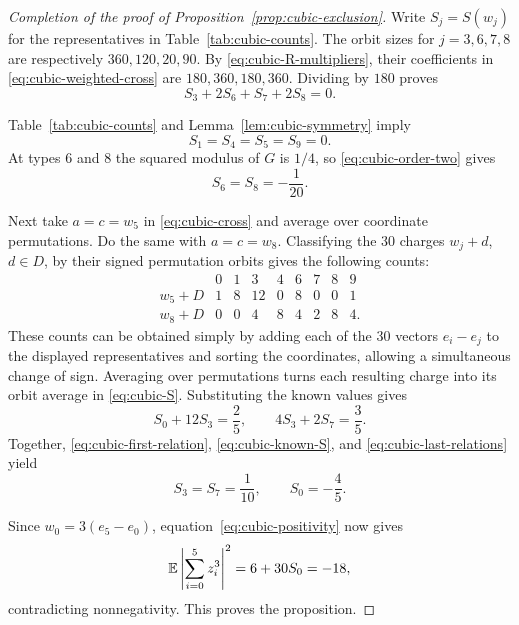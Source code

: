 \begin{proof}[Completion of the proof of Proposition~\ref{prop:cubic-exclusion}]
Write $S_j=S(w_j)$ for the representatives in Table~\ref{tab:cubic-counts}.
The orbit sizes for $j=3,6,7,8$ are respectively
$360,120,20,90$. By \eqref{eq:cubic-R-multipliers}, their coefficients in
\eqref{eq:cubic-weighted-cross}
are $180,360,180,360$. Dividing by $180$ proves
\begin{equation}\label{eq:cubic-first-relation}
 S_3+2S_6+S_7+2S_8=0.
\end{equation}

Table~\ref{tab:cubic-counts} and Lemma~\ref{lem:cubic-symmetry} imply
\[
 S_1=S_4=S_5=S_9=0.
\]
At types $6$ and $8$ the squared modulus of $G$ is $1/4$, so
\eqref{eq:cubic-order-two} gives
\begin{equation}\label{eq:cubic-known-S}
 S_6=S_8=-\frac1{20}.
\end{equation}

Next take $a=c=w_5$ in \eqref{eq:cubic-cross} and average over
coordinate permutations. Do the same with $a=c=w_8$. Classifying the
$30$ charges $w_j+d$, $d\in D$, by their signed permutation orbits
gives the following counts:
\[
\begin{array}{c|rrrrrrrr}
 &0&1&3&4&6&7&8&9\\\hline
 w_5+D&1&8&12&0&8&0&0&1\\
 w_8+D&0&0&4&8&4&2&8&4.
\end{array}
\]
These counts can be obtained simply by adding each of the $30$
vectors $e_i-e_j$ to the displayed representatives and sorting the
coordinates, allowing a simultaneous change of sign. Averaging
over permutations turns each resulting charge into its orbit
average in \eqref{eq:cubic-S}. Substituting the known values gives
\begin{equation}\label{eq:cubic-last-relations}
 S_0+12S_3=\frac25,
 \qquad 4S_3+2S_7=\frac35.
\end{equation}
Together, \eqref{eq:cubic-first-relation},
\eqref{eq:cubic-known-S}, and \eqref{eq:cubic-last-relations} yield
\[
 S_3=S_7=\frac1{10},\qquad S_0=-\frac45.
\]

Since $w_0=3(e_5-e_0)$, equation~\eqref{eq:cubic-positivity} now gives
\[
 \mathbb E\left|\sum_{i=0}^5z_i^3\right|^2
 =6+30S_0=-18,
\]
contradicting nonnegativity. This proves the proposition.
\end{proof}
